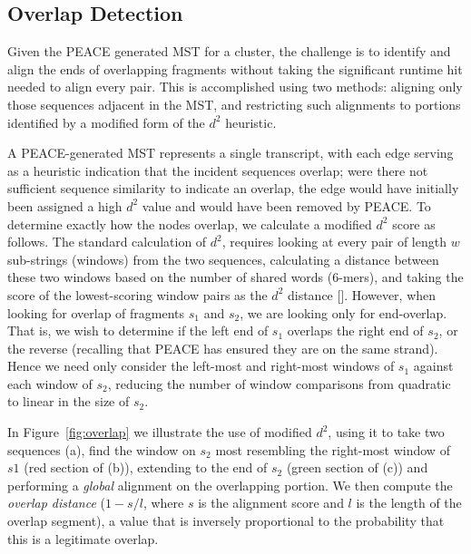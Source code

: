 \documentclass{bioinfo}
\newcommand{\peace} {{\small PEACE}}
\begin{document}
\subsection*{Overlap Detection}

Given the \peace\/ generated MST for a cluster, the challenge is to
identify and align the ends of overlapping fragments without taking
the significant runtime hit needed to align every pair.  This is
accomplished using two methods: aligning only those sequences adjacent
in the MST, and restricting such alignments to portions identified by
a modified form of the $d^2$ heuristic.


A \peace-generated MST represents a single transcript, with each edge
serving as a heuristic indication that the incident sequences overlap;
were there not sufficient sequence similarity to indicate an overlap,
the edge would have initially been assigned a high $d^2$ value and
would have been removed by \peace\/.  To determine exactly how the
nodes overlap, we calculate a modified $d^2$ score as follows.  The
standard calculation of $d^2$, requires looking at every pair of
length $w$ sub-strings (windows) from the two sequences, calculating a
distance between these two windows based on the number of shared words
(6-mers), and taking the score of the lowest-scoring window pairs as
the $d^2$ distance [\cite{Hide94}].  However, when looking for overlap
of fragments $s_1$ and $s_2$, we are looking only for end-overlap.
That is, we wish to determine if the left end of $s_1$ overlaps the
right end of $s_2$, or the reverse (recalling that \peace\/ has
ensured they are on the same strand).  Hence we need only consider the
left-most and right-most windows of $s_1$ against each window of
$s_2$, reducing the number of window comparisons from quadratic to
linear in the size of $s_2$.


In Figure~\ref{fig:overlap} we illustrate the use of modified $d^2$,
using it to take two sequences (a), find the window on $s_2$ most
resembling the right-most window of $s1$ (red section of (b)),
extending to the end of $s_2$ (green section of (c)) and performing a
{\it global} alignment on the overlapping portion.  We then compute the
{\it overlap distance} ($1 - s/l$, where $s$ is the alignment score and
$l$ is the length of the overlap segment), a value that is inversely
proportional to the probability that this is a legitimate overlap.
\end{document}
